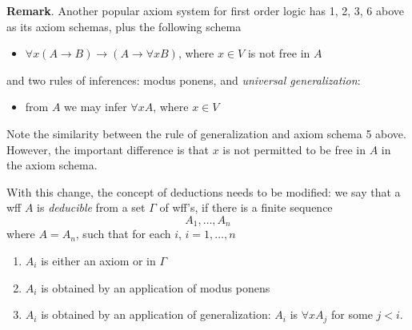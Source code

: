 \documentclass[12pt]{article}
\begin{document}
\textbf{Remark}.  Another popular axiom system for first order logic has 1, 2, 3, 6 above as its axiom schemas, plus the following schema
\begin{itemize}
\item $\forall x (A\to B) \to (A \to \forall x B)$, where $x \in V$ is not free in $A$
\end{itemize}
and two rules of inferences: modus ponens, and \emph{universal generalization}:
\begin{itemize}
\item from $A$ we may infer $\forall x A$, where $x \in V$
\end{itemize}
Note the similarity between the rule of generalization and axiom schema 5 above.  However, the important difference is that $x$ is not permitted to be free in $A$ in the axiom schema.

With this change, the concept of deductions needs to be modified: we say that a wff $A$ is \emph{deducible} from a set $\Gamma$ of wff's, if there is a finite sequence $$A_1,\ldots, A_n$$
where $A=A_n$, such that for each $i$, $i=1,\ldots, n$
\begin{enumerate}
\item $A_i$ is either an axiom or in $\Gamma$
\item $A_i$ is obtained by an application of modus ponens
\item $A_i$ is obtained by an application of generalization: $A_i$ is $\forall x A_j$ for some $j<i$.
\end{enumerate}

\end{document}
